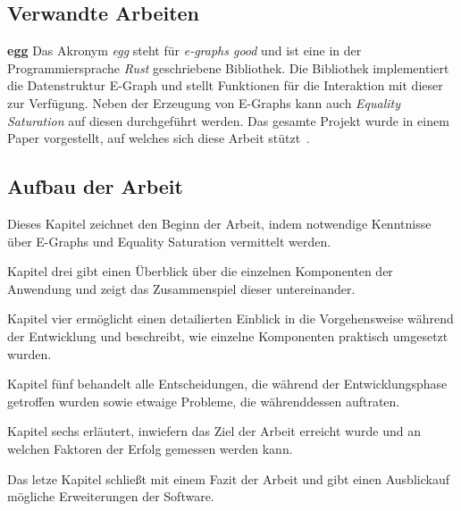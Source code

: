 \subsection{Verwandte Arbeiten}

\noindent\textbf{egg} Das Akronym \textit{egg} steht für \textit{e-graphs good} und ist eine in der Programmiersprache \textit{Rust} geschriebene Bibliothek.
Die Bibliothek implementiert die Datenstruktur E-Graph und stellt Funktionen für die Interaktion mit dieser zur Verfügung.
Neben der Erzeugung von E-Graphs kann auch \textit{Equality Saturation} auf diesen durchgeführt werden.
Das gesamte Projekt wurde in einem Paper vorgestellt, auf welches sich diese Arbeit stützt~\cite{2021-egg}.

\subsection{Aufbau der Arbeit}

\vspace{-2mm}

Dieses Kapitel zeichnet den Beginn der Arbeit, indem notwendige Kenntnisse über E-Graphs und Equality Saturation vermittelt werden.
\vspace{6mm}

\vspace{-2mm}

Kapitel drei gibt einen Überblick über die einzelnen Komponenten der Anwendung und zeigt das Zusammenspiel dieser untereinander.
\vspace{6mm}

\vspace{-2mm}

Kapitel vier ermöglicht einen detailierten Einblick in die Vorgehensweise während der Entwicklung und beschreibt, wie einzelne Komponenten praktisch umgesetzt wurden.
\vspace{6mm}

\vspace{-2mm}

Kapitel fünf behandelt alle Entscheidungen, die während der Entwicklungsphase getroffen wurden sowie etwaige Probleme, die währenddessen auftraten.
\vspace{6mm}

\vspace{-2mm}

Kapitel sechs erläutert, inwiefern das Ziel der Arbeit erreicht wurde und an welchen Faktoren der Erfolg gemessen werden kann.
\vspace{6mm}

\vspace{-2mm}

Das letze Kapitel schließt mit einem Fazit der Arbeit und gibt einen Ausblickauf mögliche Erweiterungen der Software.